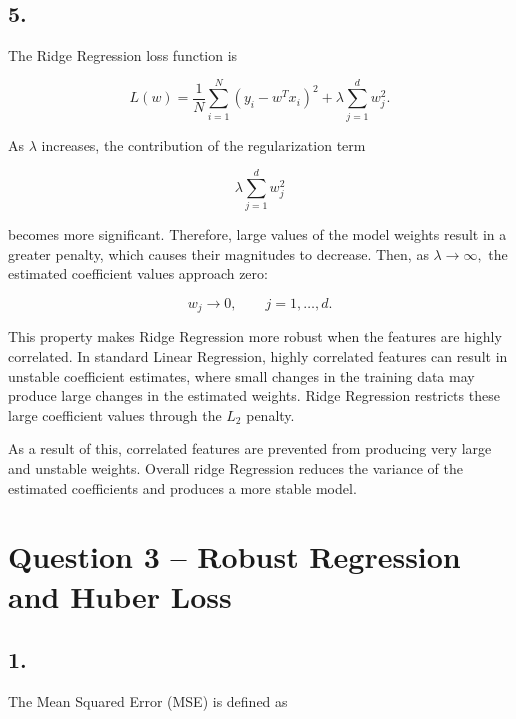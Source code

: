 \documentclass[11pt]{article}
\begin{document}
    \begin{center}
    \end{center}
    { \hspace*{\fill} \\}
    
    \subsection{5.}

The Ridge Regression loss function is

\[
L(w)
=
\frac{1}{N}
\sum_{i=1}^{N}
(y_i-w^Tx_i)^2
+
\lambda
\sum_{j=1}^{d}w_j^2.
\]

As \(\lambda\) increases, the contribution of the regularization term

\[
\lambda\sum_{j=1}^{d}w_j^2
\]

becomes more significant. Therefore, large values of the model weights
result in a greater penalty, which causes their magnitudes to decrease.
Then, as \(\lambda \rightarrow \infty,\) the estimated coefficient
values approach zero:

\[
w_j \rightarrow 0,
\qquad j=1,\ldots,d.
\]

This property makes Ridge Regression more robust when the features are
highly correlated. In standard Linear Regression, highly correlated
features can result in unstable coefficient estimates, where small
changes in the training data may produce large changes in the estimated
weights. Ridge Regression restricts these large coefficient values
through the \(L_2\) penalty.

As a result of this, correlated features are prevented from producing
very large and unstable weights. Overall ridge Regression reduces the
variance of the estimated coefficients and produces a more stable model.

    \clearpage
    \section{Question 3 -- Robust Regression and Huber
Loss}\label{question-3---robust-regression-and-huber-loss}

\subsection{1.}

The Mean Squared Error (MSE) is defined as
\end{document}
